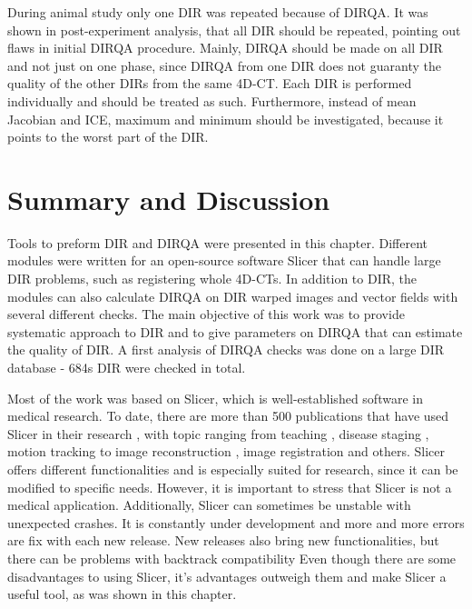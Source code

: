 During animal study only one DIR was repeated because of DIRQA. It was shown in post-experiment analysis, that all DIR should be repeated, pointing out flaws in initial DIRQA procedure.
Mainly, DIRQA should be made on all DIR and not just on one phase, since DIRQA from one DIR does not guaranty the quality of the other DIRs from the same 4D-CT. 
Each DIR is performed individually and should be treated as such. Furthermore, instead of mean Jacobian and ICE, maximum and minimum should be investigated, 
because it points to the worst part of the DIR.





\section{Summary and Discussion}
\label{Summary}

Tools to preform DIR and DIRQA were presented in this chapter. Different modules were written for an open-source software Slicer that can handle large DIR problems, such as registering whole 4D-CTs. 
In addition to DIR, the modules can also calculate DIRQA on DIR warped images and vector fields with several different checks.
The main objective of this work was to provide systematic approach to DIR and to give parameters on DIRQA that can estimate the quality of DIR. A first analysis of DIRQA checks was done on a large DIR database - 684s DIR were checked in total.

Most of the work was based on Slicer, which is well-established software in medical research. To date, there are more than 500 publications that have used Slicer in their research \cite{SlicerCitation}, with topic ranging from 
teaching \cite{Pujol2016}, disease staging \cite{Liu2015, Liu2016}, motion tracking \cite{Behringer2015} to image reconstruction \cite{Meyer2015}, image registration \cite{Li2015, Fedorov2015, Li2015b}
and others. Slicer offers different functionalities and is especially suited for research, since it can be modified to specific needs. However, it is important to stress that Slicer 
is not a medical application. Additionally, Slicer can sometimes be unstable with unexpected crashes. It is constantly under development and more and more errors
are fix with each new release. New releases also bring new functionalities, but there can be problems with backtrack compatibility Even though there are some disadvantages to using Slicer, it's advantages
outweigh them and make Slicer a useful tool, as was shown in this chapter.

